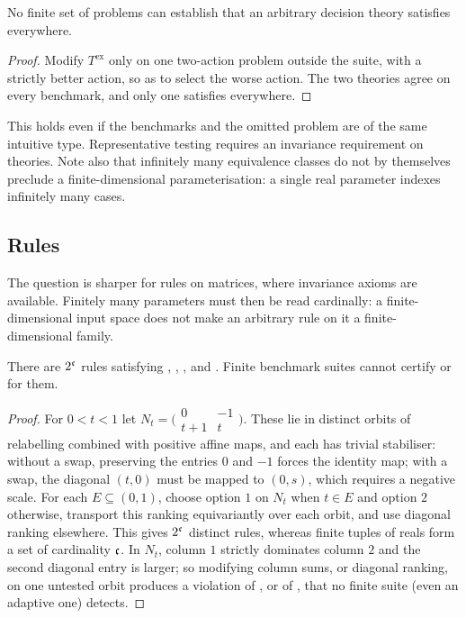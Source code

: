 \begin{proposition}\label{prop:benchmark}
No finite set of problems can establish that an arbitrary decision theory satisfies 
everywhere.
\end{proposition}

\begin{proof}
Modify $T^{\mathrm{ex}}$ only on one two-action problem outside the suite, with a strictly better
action, so as to select the worse action. The two theories agree on every benchmark, and only one
satisfies  everywhere.
\end{proof}

This holds even if the benchmarks and the omitted problem are of the same intuitive type.
Representative testing requires an invariance requirement on theories. Note also that infinitely
many equivalence classes do not by themselves preclude a finite-dimensional parameterisation: a
single real parameter indexes infinitely many cases.

\subsection{Rules}

The question is sharper for rules on matrices, where invariance axioms are available. Finitely many
parameters must then be read cardinally: a finite-dimensional input space does not make an
arbitrary rule on it a finite-dimensional family.

\begin{proposition}\label{prop:NFO}
There are $2^{\mathfrak{c}}$ rules satisfying , , , and . Finite benchmark suites cannot
certify  or  for them.
\end{proposition}

\begin{proof}
For $0<t<1$ let $N_t=\bigl(\begin{smallmatrix}0&-1\\t+1&t\end{smallmatrix}\bigr)$. These lie in distinct
orbits of relabelling combined with positive affine maps, and each has trivial stabiliser: without a
swap, preserving the entries $0$ and $-1$ forces the identity map; with a swap, the diagonal $(t,0)$
must be mapped to $(0,s)$, which requires a negative scale. For each $E\subseteq(0,1)$, choose option $1$
on $N_t$ when $t\in E$ and option $2$ otherwise, transport this ranking equivariantly over each orbit,
and use diagonal ranking elsewhere. This gives $2^{\mathfrak{c}}$ distinct rules, whereas finite tuples of reals
form a set of cardinality $\mathfrak{c}$. In $N_t$, column $1$ strictly dominates column $2$ and the second
diagonal entry is larger; so modifying column sums, or diagonal ranking, on one untested orbit
produces a violation of , or of , that no finite suite (even an adaptive one) detects.
\end{proof}

